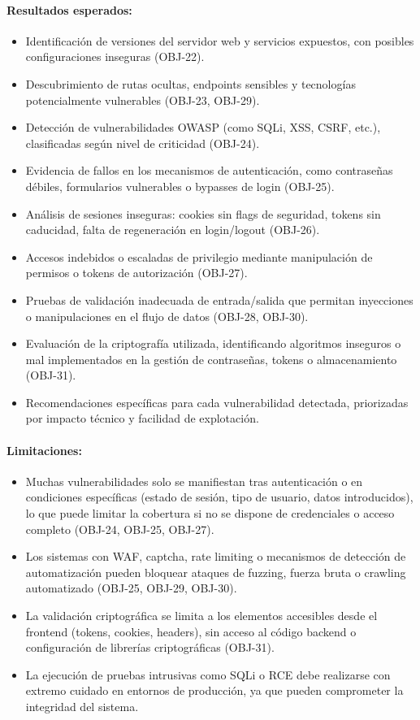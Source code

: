 \documentclass[a4paper, 10pt]{article}
\begin{document}
\paragraph{Resultados esperados:}
\begin{itemize}
    \item Identificación de versiones del servidor web y servicios expuestos, con posibles configuraciones inseguras (OBJ-22).
    \item Descubrimiento de rutas ocultas, endpoints sensibles y tecnologías potencialmente vulnerables (OBJ-23, OBJ-29).
    \item Detección de vulnerabilidades OWASP (como SQLi, XSS, CSRF, etc.), clasificadas según nivel de criticidad (OBJ-24).
    \item Evidencia de fallos en los mecanismos de autenticación, como contraseñas débiles, formularios vulnerables o bypasses de login (OBJ-25).
    \item Análisis de sesiones inseguras: cookies sin flags de seguridad, tokens sin caducidad, falta de regeneración en login/logout (OBJ-26).
    \item Accesos indebidos o escaladas de privilegio mediante manipulación de permisos o tokens de autorización (OBJ-27).
    \item Pruebas de validación inadecuada de entrada/salida que permitan inyecciones o manipulaciones en el flujo de datos (OBJ-28, OBJ-30).
    \item Evaluación de la criptografía utilizada, identificando algoritmos inseguros o mal implementados en la gestión de contraseñas, tokens o almacenamiento (OBJ-31).
    \item Recomendaciones específicas para cada vulnerabilidad detectada, priorizadas por impacto técnico y facilidad de explotación.
\end{itemize}

\paragraph{Limitaciones:}
\begin{itemize}
    \item Muchas vulnerabilidades solo se manifiestan tras autenticación o en condiciones específicas (estado de sesión, tipo de usuario, datos introducidos), lo que puede limitar la cobertura si no se dispone de credenciales o acceso completo (OBJ-24, OBJ-25, OBJ-27).
    \item Los sistemas con WAF, captcha, rate limiting o mecanismos de detección de automatización pueden bloquear ataques de fuzzing, fuerza bruta o crawling automatizado (OBJ-25, OBJ-29, OBJ-30).
    \item La validación criptográfica se limita a los elementos accesibles desde el frontend (tokens, cookies, headers), sin acceso al código backend o configuración de librerías criptográficas (OBJ-31).
    \item La ejecución de pruebas intrusivas como SQLi o RCE debe realizarse con extremo cuidado en entornos de producción, ya que pueden comprometer la integridad del sistema.
\end{itemize}
\end{document}
